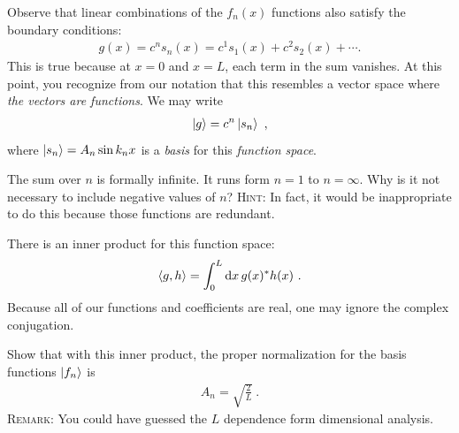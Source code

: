 \documentclass[12pt, oneside]{report}    %
\begin{document}
Observe that linear combinations of the $f_n(x)$ functions also satisfy the boundary conditions:
\begin{align}
    g(x) = c^n s_n(x) = c^1 s_1(x) + c^2 s_2(x) + \cdots. 
\end{align}
This is true because at $x=0$ and $x=L$, each term in the sum vanishes. At this point, you recognize from our notation that this resembles a vector space where \emph{the vectors are functions}. We may write
\begin{align}
    \left|g\right\rangle = c^n \left|s_n\right\rangle \ ,
\end{align}
where $\left|s_n\right\rangle =A_n \sin k_n x$ is a \emph{basis} for this \emph{function space}. 
\begin{exercise}
The sum over $n$ is formally infinite. It runs form $n=1$ to $n=\infty$. Why is it not necessary to include negative values of $n$? \textsc{Hint:} In fact, it would be inappropriate to do this because those functions are redundant.
\end{exercise}

There is an inner product for this function space:
\begin{align}
    \langle g, h \rangle = \int_0^L \operatorname{d}\!{x}\, g(x)^* h(x) \ .
\end{align}
Because all of our functions and coefficients are real, one may ignore the complex conjugation.
\begin{exercise}
Show that with this inner product, the proper normalization for the basis functions $\left|f_n\right\rangle$ is
\begin{align}
    A_n = \sqrt{\frac{2}{L}} \ .
\end{align}
\textsc{Remark}: You could have guessed the $L$ dependence form dimensional analysis.\sidenotemark
\end{exercise}
\end{document}
